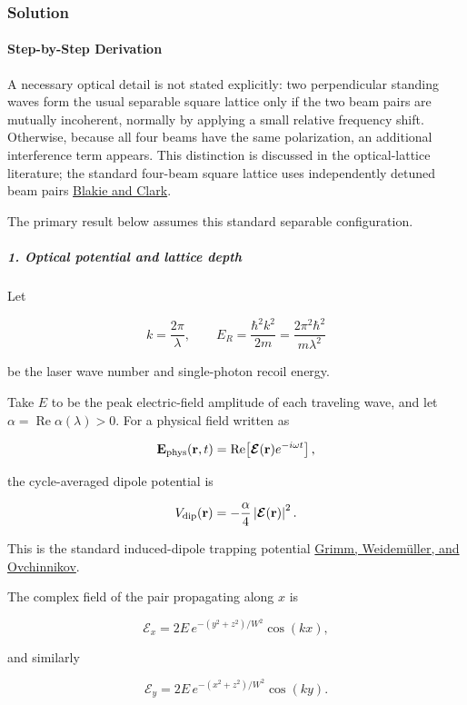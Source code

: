 \subsubsection*{Solution}
\paragraph*{Step-by-Step Derivation}

A necessary optical detail is not stated explicitly: two perpendicular standing waves form the usual separable square lattice only if the two beam pairs are mutually incoherent, normally by applying a small relative frequency shift. Otherwise, because all four beams have the same polarization, an additional interference term appears. This distinction is discussed in the optical-lattice literature; the standard four-beam square lattice uses independently detuned beam pairs \href{\detokenize{https://arxiv.org/abs/cond-mat/0403306}}{Blakie and Clark}.

The primary result below assumes this standard separable configuration.

\subparagraph*{1. Optical potential and lattice depth}

Let

\[
k=\frac{2\pi}{\lambda}, \qquad E_R=\frac{\hbar^2k^2}{2m} =\frac{2\pi^2\hbar^2}{m\lambda^2}
\]

be the laser wave number and single-photon recoil energy.

Take $E$ to be the peak electric-field amplitude of each traveling wave, and let $\alpha=\operatorname{Re}\alpha(\lambda)>0$. For a physical field written as

\[
\mathbf E_{\rm phys}(\mathbf r,t) =\operatorname{Re}\!\left[\boldsymbol{\mathcal E}(\mathbf r)e^{-i\omega t}\right],
\]

the cycle-averaged dipole potential is

\[
V_{\rm dip}(\mathbf r) =-\frac{\alpha}{4}\left|\boldsymbol{\mathcal E}(\mathbf r)\right|^2.
\]

This is the standard induced-dipole trapping potential \href{\detokenize{https://arxiv.org/abs/physics/9902072}}{Grimm, Weidemüller, and Ovchinnikov}.

The complex field of the pair propagating along $x$ is

\[
\mathcal E_x = 2E\,e^{-(y^2+z^2)/W^2}\cos(kx),
\]

and similarly

\[
\mathcal E_y = 2E\,e^{-(x^2+z^2)/W^2}\cos(ky).
\]

